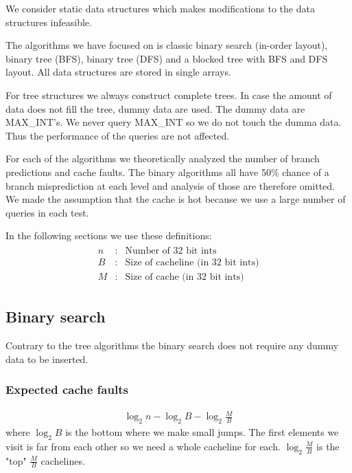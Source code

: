 We consider static data structures which makes modifications to the data structures infeasible.

The algorithms we have focused on is classic binary search (in-order layout), binary tree (BFS), binary tree (DFS) and a blocked tree with BFS and DFS layout. All data structures are stored in single arrays.

For tree structures we always construct complete trees. In case the amount of data does not fill the tree, dummy data are used. The dummy data are MAX\_INT's. We never query MAX\_INT so we do not touch the dumma data. Thus the performance of the queries are not affected.

For each of the algorithms we theoretically analyzed the number of branch predictions and cache faults. The binary algorithms all have 50\% chance of a branch misprediction at each level and analysis of those are therefore omitted. We made the assumption that the cache is hot because we use a large number of queries in each test.

In the following sections we use these definitions:
\begin{eqnarray*}
\begin{array}{rcl}
n & : & \textrm{Number of 32 bit ints} \\
B & : & \textrm{Size of cacheline (in 32 bit ints)} \\
M & : & \textrm{Size of cache (in 32 bit ints)}
\end{array}
\end{eqnarray*}

\subsection{Binary search}

Contrary to the tree algorithms the binary search does not require any dummy data to be inserted.

\subsubsection*{Expected cache faults}


\begin{eqnarray*}
\log_2 n - \log_2 B - \log_2 \frac{M}{B} 
\end{eqnarray*}
where $\log_2 B$ is the bottom where we make small jumps. The first elements we visit is far from each other so we need a whole cacheline for each. $\log_2 \frac{M}{B}$ is the "top" $\frac{M}{B}$ cachelines.

